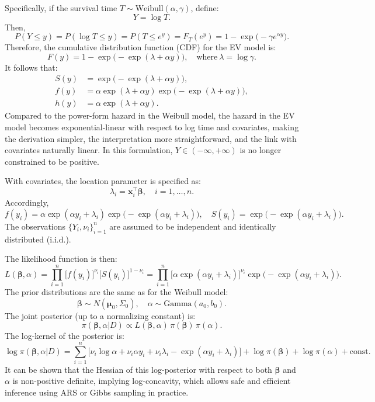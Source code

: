 Specifically, if the survival time $T \sim \text{Weibull}(\alpha, \gamma)$, define:
$$
Y = \log T.
$$
Then,
$$
P(Y \le y) 
= P(\log T \le y)
= P(T \le e^y)
= F_T(e^y)
= 1 - \exp\big( - \gamma e^{\alpha y} \big).
$$
Therefore, the cumulative distribution function (CDF) for the EV model is:
$$
F(y) = 1 - \exp\big( - \exp(\lambda + \alpha y) \big), 
\quad \text{where}~\lambda = \log \gamma.
$$
It follows that:
$$
\begin{aligned}
S(y) &= \exp\big( - \exp(\lambda + \alpha y) \big),\\
f(y) &= \alpha \exp(\lambda + \alpha y) \exp\big( - \exp(\lambda + \alpha y) \big),\\
h(y) &= \alpha \exp(\lambda + \alpha y).
\end{aligned}
$$
Compared to the power-form hazard in the Weibull model, the hazard in the EV model becomes exponential-linear with respect to log time and covariates, making the derivation simpler, the interpretation more straightforward, and the link with covariates naturally linear. In this formulation, $Y \in (-\infty, +\infty)$ is no longer constrained to be positive.

With covariates, the location parameter is specified as:
$$
\lambda_i = \mathbf{x}_i^\top \boldsymbol{\beta}, 
\quad i = 1, \ldots, n.
$$
Accordingly,
$$
f(y_i) = \alpha \exp(\alpha y_i + \lambda_i) \exp\big( -\exp(\alpha y_i + \lambda_i) \big), 
\quad
S(y_i) = \exp\big( -\exp(\alpha y_i + \lambda_i) \big).
$$
The observations $\{ Y_i, \nu_i \}_{i=1}^n$ are assumed to be independent and identically distributed (i.i.d.).

The likelihood function is then:
$$
L(\boldsymbol{\beta}, \alpha) 
= \prod_{i=1}^n 
\big[ f(y_i) \big]^{\nu_i} 
\big[ S(y_i) \big]^{1 - \nu_i}
= \prod_{i=1}^n 
\big[ \alpha \exp(\alpha y_i + \lambda_i) \big]^{\nu_i} 
\exp\big( -\exp(\alpha y_i + \lambda_i) \big).
$$
The prior distributions are the same as for the Weibull model:
$$
\boldsymbol{\beta} \sim N(\boldsymbol{\mu}_0, \Sigma_0), 
\quad 
\alpha \sim \text{Gamma}(a_0, b_0).
$$
The joint posterior (up to a normalizing constant) is:
$$
\pi(\boldsymbol{\beta}, \alpha | D) 
\propto L(\boldsymbol{\beta}, \alpha)
\, \pi(\boldsymbol{\beta}) 
\, \pi(\alpha).
$$
The log-kernel of the posterior is:
$$
\log \pi(\boldsymbol{\beta}, \alpha | D)
= \sum_{i=1}^n 
\big[
\nu_i \log \alpha + \nu_i \alpha y_i + \nu_i \lambda_i - \exp(\alpha y_i + \lambda_i)
\big]
+ \log \pi(\boldsymbol{\beta}) + \log \pi(\alpha) + \text{const}.
$$
It can be shown that the Hessian of this log-posterior with respect to both $\boldsymbol{\beta}$ and $\alpha$ is non-positive definite, implying log-concavity, which allows safe and efficient inference using ARS or Gibbs sampling in practice.
